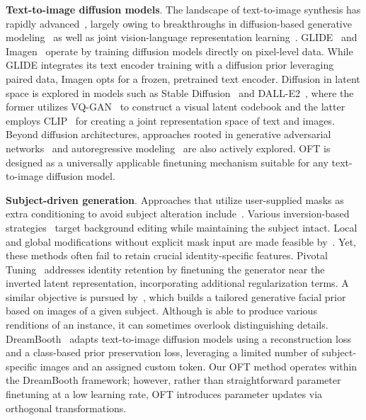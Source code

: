 \textbf{Text-to-image diffusion models}. The landscape of text-to-image synthesis has rapidly advanced~\cite{saharia2022photorealistic,ramesh2022hierarchical,rombach2022high,gu2022vector,nichol2022glide}, largely owing to breakthroughs in diffusion-based generative modeling~\cite{ho2020denoising,song2021score,song2021denoising,dhariwal2021diffusion} as well as joint vision-language representation learning~\cite{su2020vlbert,lu2019vilbert,radford2021learning,wang2021simvlm,li2022blip,li2023blip,alayrac2022flamingo,schuhmann2022laion}. GLIDE~\cite{nichol2022glide} and Imagen~\cite{saharia2022photorealistic} operate by training diffusion models directly on pixel-level data. While GLIDE integrates its text encoder training with a diffusion prior leveraging paired data, Imagen opts for a frozen, pretrained text encoder. Diffusion in latent space is explored in models such as Stable Diffusion~\cite{rombach2022high} and DALL-E2~\cite{ramesh2022hierarchical}, where the former utilizes VQ-GAN~\cite{esser2021taming} to construct a visual latent codebook and the latter employs CLIP~\cite{radford2021learning} for creating a joint representation space of text and images. Beyond diffusion architectures, approaches rooted in generative adversarial networks~\cite{reed2016generative,zhang2017stackgan,xu2018attngan,li2019controllable} and autoregressive modeling~\cite{ramesh2021zero,ding2021cogview,wu2022nuwa,yuscaling} are also actively explored. OFT is designed as a universally applicable finetuning mechanism suitable for any text-to-image diffusion model.

\textbf{Subject-driven generation}. Approaches that utilize user-supplied masks as extra conditioning to avoid subject alteration include~\cite{avrahami2022blended,nichol2022glide}. Various inversion-based strategies~\cite{choi2021ilvr,dhariwal2021diffusion,ramesh2022hierarchical,gal2022image} target background editing while maintaining the subject intact. Local and global modifications without explicit mask input are made feasible by~\cite{hertz2022prompt}. Yet, these methods often fail to retain crucial identity-specific features. Pivotal Tuning~\cite{roich2022pivotal} addresses identity retention by finetuning the generator near the inverted latent representation, incorporating additional regularization terms. A similar objective is pursued by~\cite{nitzan2022mystyle}, which builds a tailored generative facial prior based on images of a given subject. Although \cite{casanova2021instance} is able to produce various renditions of an instance, it can sometimes overlook distinguishing details. DreamBooth~\cite{ruiz2023dreambooth} adapts text-to-image diffusion models using a reconstruction loss and a class-based prior preservation loss, leveraging a limited number of subject-specific images and an assigned custom token. Our OFT method operates within the DreamBooth framework; however, rather than straightforward parameter finetuning at a low learning rate, OFT introduces parameter updates via orthogonal transformations.

